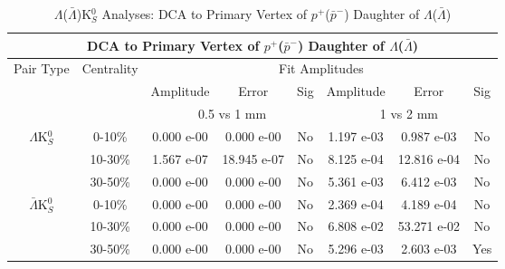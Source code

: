 \documentclass[../AnalysisNoteJBuxton.tex]{subfiles}
\begin{document}
\begin{table}
 \centering
 \begin{tabular}{|c|c|c|c|c||c|c|c|}
  \multicolumn{8}{c}{DCA to Primary Vertex of $p^{+}$($\bar{p}^{-}$) Daughter of $\Lambda$($\bar{\Lambda}$)} \\
  \hline
  \multirow{3}{*}{Pair Type} & \multirow{3}{*}{Centrality} & \multicolumn{6}{c|}{Fit Amplitudes} \\
  \cline{3-8}
   & & Amplitude & Error & Sig & Amplitude & Error & Sig \\  
  \cline{3-8}
   & & \multicolumn{3}{c||}{0.5 vs 1 mm} & \multicolumn{3}{c|}{1 vs 2 mm} \\  
  \hline  
  \multirow{3}{*}{$\Lambda$K$^{0}_{S}$}  
   &  0-10\% & 0.000 e-00 & 0.000 e-00 & No & 1.197 e-03 & 0.987 e-03 & No \\
   & 10-30\% & 1.567 e-07 & 18.945 e-07 & No & 8.125 e-04 & 12.816 e-04 & No \\
   & 30-50\% & 0.000 e-00 & 0.000 e-00 & No & 5.361 e-03 & 6.412 e-03 & No \\
  \hline  
  \multirow{3}{*}{$\bar{\Lambda}$K$^{0}_{S}$}  
   &  0-10\% & 0.000 e-00 & 0.000 e-00 & No & 2.369 e-04 & 4.189 e-04 & No \\
   & 10-30\% & 0.000 e-00 & 0.000 e-00 & No & 6.808 e-02 & 53.271 e-02 & No \\
   & 30-50\% & 0.000 e-00 & 0.000 e-00 & No & 5.296 e-03 & 2.603 e-03 & Yes \\
  \hline
 \end{tabular}
 \caption{$\Lambda$($\bar{\Lambda}$)K$^{0}_{S}$ Analyses: DCA to Primary Vertex of $p^{+}$($\bar{p}^{-}$) Daughter of $\Lambda$($\bar{\Lambda}$)}
 \label{tab:DcaToPrimVertexProtonDaughtOfLamLamK0}
\end{table}
\end{document}
